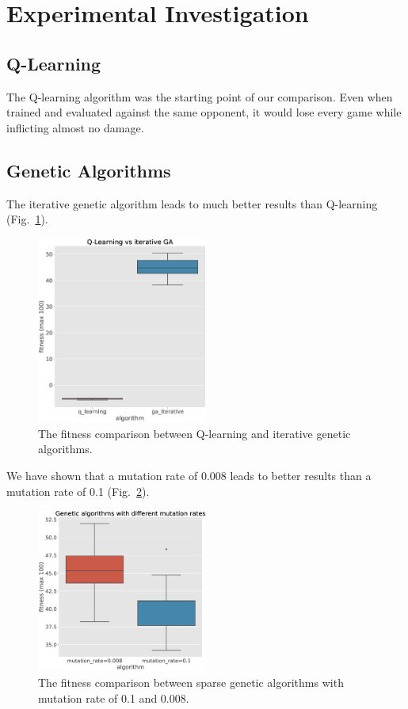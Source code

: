 \documentclass[conference]{IEEEtran}
\begin{document}
    \section{Experimental Investigation}\label{sec:experimental-investigation}

    \subsection{Q-Learning}\label{subsec:q-learning2}
    The Q-learning algorithm was the starting point of our comparison.
    Even when trained and evaluated against the same opponent, it would lose every game
    while inflicting almost no damage.

    \subsection{Genetic Algorithms}\label{subsec:genetic-algorithms}
    The iterative genetic algorithm leads to much better results than Q-learning (Fig.~\ref{fig:q_vs_ga_iterative}).
    \begin{figure}[!h]
        \centering
        \includegraphics[width=0.5\textwidth]{old_images/q_vs_ga_iterative.eps}
        \caption{The fitness comparison between Q-learning and iterative genetic algorithms.}
        \label{fig:q_vs_ga_iterative}
    \end{figure}

    We have shown that a mutation rate of 0.008 leads to better results than a mutation rate of 0.1 (Fig.~\ref{fig:ga_mutation_rates}).
    \begin{figure}[!h]
        \centering
        \includegraphics[width=0.5\textwidth]{old_images/ga_mutation_rates.eps}
        \caption{The fitness comparison between sparse genetic algorithms with mutation rate of 0.1 and 0.008.}
        \label{fig:ga_mutation_rates}
    \end{figure}
\end{document}
